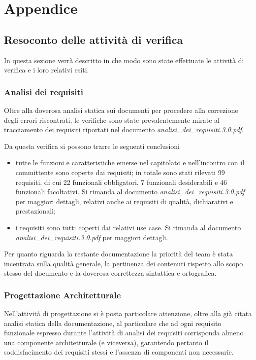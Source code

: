 \clearpage

\section{Appendice}

\subsection{Resoconto delle attività di verifica}
In questa sezione verrà descritto in che modo sono state effettuate le attività di verifica e i loro relativi esiti.

\subsubsection{Analisi dei requisiti}
Oltre alla doverosa analisi statica sui documenti per procedere alla correzione degli errori riscontrati, le verifiche sono state prevalentemente mirate al tracciamento dei requisiti riportati nel documento \textit{analisi\_dei\_requisiti.3.0.pdf}.

Da questa verifica si possono trarre le seguenti conclusioni
\begin{itemize}
\item tutte le funzioni e caratteristiche emerse nel capitolato e nell'incontro con il committente sono coperte dai requisiti;
in totale sono stati rilevati 99 requisiti, di cui 22 funzionali obbligatori, 7 funzionali desiderabili e 46 funzionali facoltativi. Si rimanda al documento \textit{analisi\_dei\_requisiti.3.0.pdf} per maggiori dettagli, relativi anche ai requisiti di qualità, dichiarativi e prestazionali;

\item i requisiti sono tutti coperti dai relativi use case. Si rimanda al documento \textit{analisi\_dei\_requisiti.3.0.pdf} per maggiori dettagli.
\end{itemize}

Per quanto riguarda la restante documentazione la priorità del team è stata incentrata sulla qualità generale, la pertinenza dei contenuti rispetto allo scopo stesso del documento e la doverosa correttezza sintattica e ortografica.

\subsubsection {Progettazione Architetturale}
Nell'attività di progettazione si è posta particolare attenzione, oltre alla già citata analisi statica della documentazione, al particolare che ad ogni requisito funzionale espresso durante l'attività di analisi dei requisiti corrisponda almeno una componente architetturale (e viceversa), garantendo pertanto il soddisfacimento dei requisiti stessi e l'assenza di componenti non necessarie.

